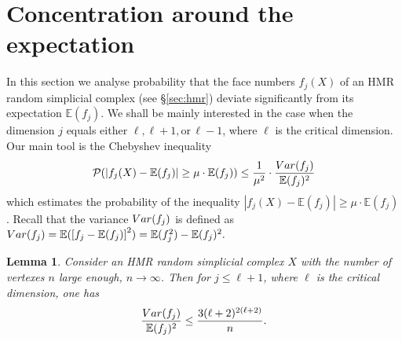 \documentclass[10pt,a4paper]{amsart}
\newtheorem{lema}{Lemma}
\newcommand{\E}{\mathbb{E}}
\begin{document}
\section{Concentration around the expectation}

In this section we analyse probability that the face numbers $f_j(X)$ of an HMR random simplicial complex 
(see \S \ref{sec:hmr})
deviate significantly from its expectation $\E(f_j)$. We shall be mainly interested in the case when the dimension $j$ equals either $\ell, \ell+1, \mbox{or}\, \ell-1$, where $\ell$ is the critical dimension. 
Our main tool is the Chebyshev inequality 
\begin{eqnarray}\label{in:32f}
\mathcal P(|f_j(X) - \mathbb E(f_j)|\ge \mu \cdot \mathbb E(f_j)) \le \frac{1}{\mu^2}\cdot \frac{{\rm {Var}}(f_j)}{\mathbb E(f_j)^2}
\end{eqnarray}
which estimates the probability of the inequality $|f_j(X) - \mathbb E(f_j)|\ge \mu \cdot \mathbb E(f_j)$. Recall that the variance  
${\rm {Var}}(f_j)$ is defined as 
${\rm {Var}}(f_j)=\E(\left [f_j-\E(f_j)\right ]^2)=\E(f_j^2)-\E(f_j)^2.$

\begin{lema}\label{lm:26}
Consider an HMR random simplicial complex $X$ with the number of vertexes $n$ large enough, $n\to \infty$. Then for $j\le \ell+1$, where $\ell$ is the critical dimension, one has 
$$
\frac{{{\rm {Var}}(f_j)}}{\E(f_j)^2}\le \frac{3 (\ell+2)^{2(\ell+2)}}{n}.
$$
\end{lema}
\end{document}
